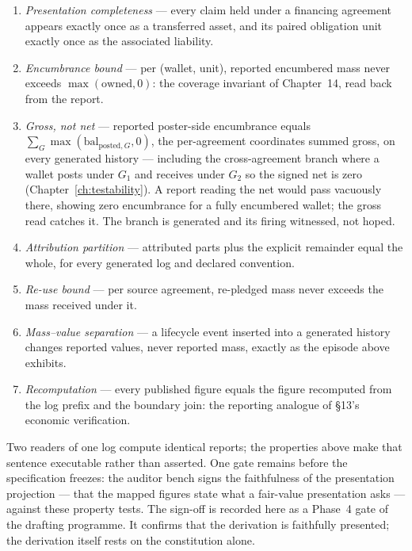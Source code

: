 \begin{enumerate}[nosep]
\item \emph{Presentation completeness} --- every claim held under a financing
  agreement appears exactly once as a transferred asset, and its paired
  obligation unit exactly once as the associated liability.
\item \emph{Encumbrance bound} --- per (wallet, unit), reported encumbered mass
  never exceeds $\max(\text{owned}, 0)$: the coverage invariant of Chapter~14,
  read back from the report.
\item \emph{Gross, not net} --- reported poster-side encumbrance equals
  $\sum_G \max(\mathrm{bal}_{\text{posted},G}, 0)$, the per-agreement coordinates
  summed gross, on every generated history --- including the cross-agreement branch
  where a wallet posts under $G_1$ and receives under $G_2$ so the signed net is
  zero (Chapter~\ref{ch:testability}). A report reading the net would pass vacuously
  there, showing zero encumbrance for a fully encumbered wallet; the gross read
  catches it. The branch is generated and its firing witnessed, not hoped.
\item \emph{Attribution partition} --- attributed parts plus the explicit
  remainder equal the whole, for every generated log and declared convention.
\item \emph{Re-use bound} --- per source agreement, re-pledged mass never
  exceeds the mass received under it.
\item \emph{Mass--value separation} --- a lifecycle event inserted into a
  generated history changes reported values, never reported mass, exactly as
  the episode above exhibits.
\item \emph{Recomputation} --- every published figure equals the figure
  recomputed from the log prefix and the boundary join: the reporting analogue
  of \S 13's economic verification.
\end{enumerate}

Two readers of one log compute identical reports; the properties above make
that sentence executable rather than asserted. One gate remains before the
specification freezes: the auditor bench signs the faithfulness of the
presentation projection --- that the mapped figures state what a fair-value
presentation asks --- against these property tests. The sign-off is recorded
here as a Phase~4 gate of the drafting programme. It confirms that the
derivation is faithfully presented; the derivation itself rests on the
constitution alone.
